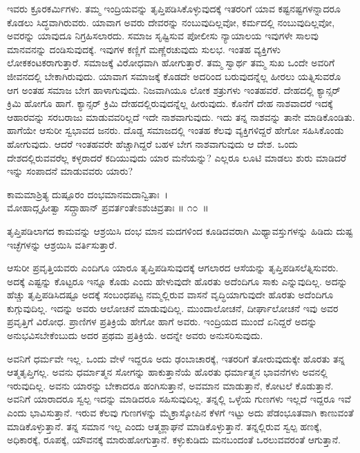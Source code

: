 ಇವರು ಕ್ರೂರಕರ್ಮಿಗಳು. ತಮ್ಮ ಇಂದ್ರಿಯವನ್ನು ತೃಪ್ತಿಪಡಿಸಿಕೊಳ್ಳುವುದಕ್ಕೆ ಇತರರಿಗೆ ಯಾವ ಕಷ್ಟನಷ್ಟಗಳನ್ನಾದರೂ ಕೊಡಲು ಸಿದ್ಧವಾಗಿರುವರು. ಯಾವಾಗ ಅವರು ದೇವರನ್ನು ನಂಬುವುದಿಲ್ಲವೋ, ಕರ್ಮದಲ್ಲಿ ನಂಬುವುದಿಲ್ಲವೋ, ಅವರನ್ನು ಯಾವುದೂ ನಿಗ್ರಹಿಸಲಾರದು. ಸಮಾಜ ಸೃಷ್ಟಿಸುವ ಪೋಲೀಸು ನ್ಯಾಯಾಲಯ ಇವುಗಳೇ ಸಾಲವು ಮಾನವನನ್ನು ದಂಡಿಸುವುದಕ್ಕೆ. ಇವುಗಳ ಕಣ್ಣಿಗೆ ಮಣ್ಣೆರಚುವುದು ಸುಲಭ. ಇಂತಹ ವ್ಯಕ್ತಿಗಳು ಲೋಕಕಂಟಕರಾಗುತ್ತಾರೆ. ಸಮಾಜಕ್ಕೆ ವಿರೋಧವಾಗಿ ಹೋಗುತ್ತಾರೆ. ತಮ್ಮ ಸ್ವಾರ್ಥ ತಮ್ಮ ಸುಖ ಒಂದೇ ಅವರಿಗೆ ಜೀವನದಲ್ಲಿ ಬೇಕಾಗಿರುವುದು. ಯಾವಾಗ ಸಮಾಜಕ್ಕೆ ಕೊಡದೇ ಅದರಿಂದ ಬರುವುದನ್ನೆಲ್ಲ ಹೀರಲು ಯತ್ನಿಸುವರೊ ಆಗ ಅಂತಹ ಸಮಾಜ ಬೇಗ ಹಾಳಾಗುವುದು. ನಿಜವಾಗಿಯೂ ಲೋಕ ಶತ್ರುಗಳು ಇಂತಹವರೆ. ದೇಹದಲ್ಲಿ ಕ್ಯಾನ್ಸರ್ ಕ್ರಿಮಿ ಹೋಗೊ ಹಾಗೆ. ಕ್ಯಾನ್ಸರ್ ಕ್ರಿಮಿ ದೇಹದಲ್ಲಿರುವುದನ್ನೆಲ್ಲ ಹೀರುವುದು. ಕೊನೆಗೆ ದೇಹ ನಾಶವಾದರೆ ಇದಕ್ಕೆ ಆಹಾರವನ್ನು ಸರಬರಾಜು ಮಾಡುವವರಿಲ್ಲದೆ ಇದೇ ನಾಶವಾಗುವುದು. ಇದು ತನ್ನ ನಾಶವನ್ನು ತಾನೇ ಮಾಡಿಕೊಂಡಿತು. ಹಾಗೆಯೇ ಆಸುರೀ ಸ್ವಭಾವದ ಜನರು. ದೊಡ್ಡ ಸಮಾಜದಲ್ಲಿ ಇಂತಹ ಕೆಲವು ವ್ಯಕ್ತಿಗಳಿದ್ದರೆ ಹೇಗೋ ಸಹಿಸಿಕೊಂಡು ಹೋಗುವುದು. ಆದರೆ ಇಂತಹವರೇ ಹೆಚ್ಚಾಗಿದ್ದರೆ ಬಹಳ ಬೇಗ ನಾಶವಾಗುವುದು ಆ ದೇಶ. ಒಂದು ದೇಶದಲ್ಲಿರುವವರೆಲ್ಲ ಕಳ್ಳರಾದರೆ ಕದಿಯುವುದು ಯಾರ ಮನೆಯನ್ನು? ಎಲ್ಲರೂ ಲೂಟಿ ಮಾಡಲು ಶುರು ಮಾಡಿದರೆ ಇನ್ನು ಸಂಪಾದನೆ ಮಾಡುವವರು ಯಾರು?

\begin{shloka}
ಕಾಮಮಾಶ್ರಿತ್ಯ ದುಷ್ಪೂರಂ ದಂಭಮಾನಮದಾನ್ವಿತಾಃ~।\\ಮೋಹಾದ್ಗೃಹೀತ್ವಾ ಸದ್ಗ್ರಾಹಾನ್ ಪ್ರವರ್ತಂತೇಽಶುಚಿವ್ರತಾಃ \hfill॥ ೧೦~॥
\end{shloka}

\begin{artha}
ತೃಪ್ತಿಪಡಿಲಾಗದ ಕಾಮವನ್ನು ಆಶ್ರಯಿಸಿ ದಂಭ ಮಾನ ಮದಗಳಿಂದ ಕೂಡಿದವರಾಗಿ ಮಿಥ್ಯಾವಸ್ತುಗಳನ್ನು ಹಿಡಿದು ದುಷ್ಟ ಇಚ್ಛೆಗಳನ್ನು ಆಶ್ರಯಿಸಿ ವರ್ತಿಸುತ್ತಾರೆ.
\end{artha}

ಆಸುರೀ ಪ್ರವೃತ್ತಿಯವರು ಎಂದಿಗೂ ಯಾರೂ ತೃಪ್ತಿಪಡಿಸುವುದಕ್ಕೆ ಆಗಲಾರದ ಆಸೆಯನ್ನು ತೃಪ್ತಿಪಡಿಸಲೆತ್ನಿಸುವರು. ಅದಕ್ಕೆ ಎಷ್ಟನ್ನು ಕೊಟ್ಟರೂ ಇನ್ನೂ ಕೊಡು ಎಂದು ಹೇಳುವುದೇ ಹೊರತು ಅದೆಂದಿಗೂ ಸಾಕು ಎನ್ನುವುದಿಲ್ಲ. ಅದನ್ನು ಹೆಚ್ಚು ತೃಪ್ತಿಪಡಿಸಿದಷ್ಟೂ ಅದಕ್ಕೆ ಸಂಬಂಧಪಟ್ಟ ನಮ್ಮಲ್ಲಿರುವ ವಾಸನೆ ವೃದ್ಧಿಯಾಗುವುದೇ ಹೊರತು ಅದೆಂದಿಗೂ ಕುಗ್ಗುವುದಿಲ್ಲ. ಇದನ್ನು ಅವರು ಆಲೋಚನೆ ಮಾಡುವುದಿಲ್ಲ. ಮುಂದಾಲೋಚನೆ, ದೀರ್ಘಾಲೋಚನೆ ಇವು ಅವರ ಪ್ರವೃತ್ತಿಗೆ ವಿರೋಧ. ಪ್ರಾಣಿಗಳ ಪ್ರತಿಕ್ರಿಯೆ ಹೇಗೋ ಹಾಗೆ ಅವರು. ಇಂದ್ರಿಯದ ಮುಂದೆ ಏನಿದ್ದರೆ ಅದನ್ನು ಅನುಭವಿಸಬೇಕೆಂಬುದು ಅದರ ಪ್ರಥಮ ಪ್ರತಿಕ್ರಿಯೆ. ಅದನ್ನೇ ಅವರು ಅನುಸರಿಸುವುದು.

ಅವನಿಗೆ ಧರ್ಮವೇ ಇಲ್ಲ. ಒಂದು ವೇಳೆ ಇದ್ದರೂ ಅದು ಢಂಬಾಚಾರಕ್ಕೆ, ಇತರರಿಗೆ ತೋರುವುದುಕ್ಕೇ ಹೊರತು ತನ್ನ ಆತ್ಮತೃಪ್ತಿಗಲ್ಲ. ಅವನು ಧರ್ಮಾತ್ಮನ ಸೋಗನ್ನು ಹಾಕುತ್ತಾನೆಯೆ ಹೊರತು ಧರ್ಮಾತ್ಮನ ಭಾವನೆಗಳು ಅವನಲ್ಲಿ ಇರುವುದಿಲ್ಲ. ಅವನು ಯಾರನ್ನು ಬೇಕಾದರೂ ಹಂಗಿಸುತ್ತಾನೆ, ಅವಮಾನ ಮಾಡುತ್ತಾನೆ, ಕೋಟಲೆ ಕೊಡುತ್ತಾನೆ. ಅವನಿಗೆ ಯಾರಾದರೂ ಸ್ವಲ್ಪ ಇದನ್ನು ಮಾಡಿದರೂ ಸಹಿಸುವುದಿಲ್ಲ. ತನ್ನಲ್ಲಿ ಒಳ್ಳೆಯ ಗುಣಗಳು ಇಲ್ಲದೆ ಇದ್ದರೂ ಇವೆ ಎಂದು ಭಾವಿಸುತ್ತಾನೆ. ಇರುವ ಕೆಲವು ಗುಣಗಳನ್ನು ಮೈಕ್ರಾಸ್ಕೋಪಿನ ಕೆಳಗೆ ಇಟ್ಟು ಅದು ಪೆಡಂಭೂತವಾಗಿ ಕಾಣುವಂತೆ ಮಾಡಿಕೊಳ್ಳುತ್ತಾನೆ. ತನ್ನ ಸಮಾನ ಇಲ್ಲ ಎಂದು ಆತ್ಮಶ್ಲಾಘನೆ ಮಾಡಿಕೊಳ್ಳುತ್ತಾನೆ. ತನ್ನಲ್ಲಿರುವ ಸ್ವಲ್ಪ ಹಣಕ್ಕೆ, ಅಧಿಕಾರಕ್ಕೆ, ರೂಪಕ್ಕೆ, ಯೌವನಕ್ಕೆ ಮಾರುಹೋಗುತ್ತಾನೆ. ಕಳ್ಳುಕುಡಿದು ಮನಬಂದಂತೆ ಒರಲುವವರಂತೆ ಆಗುತ್ತಾನೆ.

